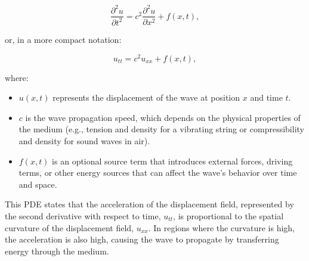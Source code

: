 \documentclass{article}
\begin{document}
		\begin{equation}
			\frac{\partial^2 u}{\partial t^2} = c^2 \frac{\partial^2 u}{\partial x^2} + f(x, t),
		\end{equation}
		
		or, in a more compact notation:
		
		\begin{equation}
			u_{tt} = c^2 u_{xx} + f(x,t),
		\end{equation}
		
		where:
		\begin{itemize}
			\item $u(x, t)$ represents the displacement of the wave at position $x$ and time $t$.
			\item $c$ is the wave propagation speed, which depends on the physical properties of the medium (e.g., tension and density for a vibrating string or compressibility and density for sound waves in air).
			\item $f(x, t)$ is an optional source term that introduces external forces, driving terms, or other energy sources that can affect the wave’s behavior over time and space.
		\end{itemize}
		
		This PDE states that the acceleration of the displacement field, represented by the second derivative with respect to time, $u_{tt}$, is proportional to the spatial curvature of the displacement field, $u_{xx}$. In regions where the curvature is high, the acceleration is also high, causing the wave to propagate by transferring energy through the medium.
	
\end{document}
